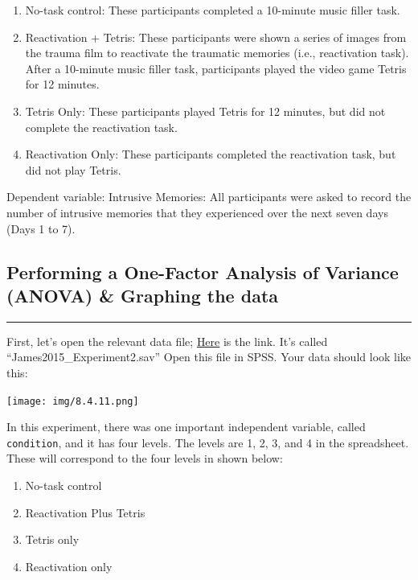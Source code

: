 \documentclass[]{book}
\providecommand{\tightlist}{%
  \setlength{\itemsep}{0pt}\setlength{\parskip}{0pt}}
\begin{document}
\begin{enumerate}
\def\labelenumi{\arabic{enumi}.}
\tightlist
\item
  No-task control: These participants completed a 10-minute music filler
  task.
\item
  Reactivation + Tetris: These participants were shown a series of
  images from the trauma film to reactivate the traumatic memories
  (i.e., reactivation task). After a 10-minute music filler task,
  participants played the video game Tetris for 12 minutes.
\item
  Tetris Only: These participants played Tetris for 12 minutes, but did
  not complete the reactivation task.
\item
  Reactivation Only: These participants completed the reactivation task,
  but did not play Tetris.
\end{enumerate}

Dependent variable: Intrusive Memories: All participants were asked to
record the number of intrusive memories that they experienced over the
next seven days (Days 1 to 7).

\subsection{Performing a One-Factor Analysis of Variance (ANOVA) \&
Graphing the
data}\label{performing-a-one-factor-analysis-of-variance-anova-graphing-the-data}

\begin{center}\rule{0.5\linewidth}{0.5pt}\end{center}

First, let's open the relevant data file;
\href{https://github.com/CrumpLab/statisticsLab/blob/master/data/spssdata/James2015_Experiment2.sav}{Here}
is the link. It's called ``James2015\_Experiment2.sav'' Open this file
in SPSS. Your data should look like this:

\texttt{[image: img/8.4.11.png]}

In this experiment, there was one important independent variable, called
\texttt{condition}, and it has four levels. The levels are 1, 2, 3, and
4 in the spreadsheet. These will correspond to the four levels in shown
below:

\begin{enumerate}
\def\labelenumi{\arabic{enumi}.}
\tightlist
\item
  No-task control
\item
  Reactivation Plus Tetris
\item
  Tetris only
\item
  Reactivation only
\end{enumerate}
\end{document}
